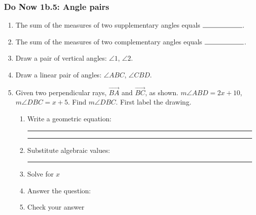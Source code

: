 \documentclass[12pt, oneside]{article}
\begin{document}
\subsubsection*{Do Now 1b.5: Angle pairs} %
  \begin{enumerate}
    \item The sum of the measures of two supplementary angles equals $\rule{2cm}{0.15mm}$. \bigskip
    \item The sum of the measures of two complementary angles equals $\rule{2cm}{0.15mm}$.
    \item Draw a pair of vertical angles: $\angle 1$, $\angle 2$. \vspace{2cm}
    \item Draw a linear pair of angles: $\angle ABC$, $\angle CBD$. \vspace{3cm}

    \item Given two perpendicular rays, $\overrightarrow{BA}$ and $\overrightarrow{BC}$, as shown. $m \angle ABD = 2x+10$, $m \angle DBC = x+5$. Find $m \angle DBC$.
    First label the drawing.
    \begin{flushright}
    \end{flushright}
    \begin{enumerate}
      \item Write a geometric equation: \rule{4cm}{0.15mm} \hspace{1cm} \rule{4cm}{0.15mm}
      \vspace{.5cm}
      \item Substitute algebraic values: \rule{4cm}{0.15mm}
      \item Solve for $x$
      \vspace{2cm}
      \item Answer the question:
      \vspace{1cm}
      \item Check your answer
    \end{enumerate}

  \end{enumerate}
\end{document}
